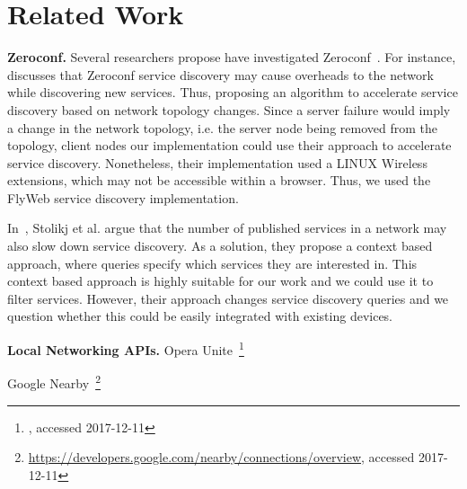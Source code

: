\section{Related Work}
\label{sec:related_work}

\textbf{Zeroconf.}
Several researchers propose have investigated Zeroconf~\cite{Gunes2002, Bohnenkamp2003, Jara:2012:IPv6DNS-SD}.
For instance, \cite{hong2007accelerating} discusses that Zeroconf service discovery may cause overheads to the network while discovering new services.
Thus, proposing an algorithm to accelerate service discovery based on network topology changes.
Since a server failure would imply a change in the network topology, i.e. the server node being removed from the topology, 
client nodes our implementation could use their approach to accelerate service discovery. 
Nonetheless, their implementation used a LINUX Wireless extensions, which may not be accessible within a browser.
Thus, we used the FlyWeb service discovery implementation.

In~\cite{stolikj2016context}, Stolikj et al. argue that the number of published services in a network may also slow down service discovery.
As a solution, they propose a context based approach, where queries specify which services they are interested in.
This context based approach is highly suitable for our work and we could use it to filter \APIshort services.
However, their approach changes service discovery queries and we question whether this could be easily integrated with existing devices.


\textbf{Local Networking APIs.}
Opera Unite~\footnote{, accessed 2017-12-11}

Google Nearby~\footnote{\url{https://developers.google.com/nearby/connections/overview}, accessed 2017-12-11}




